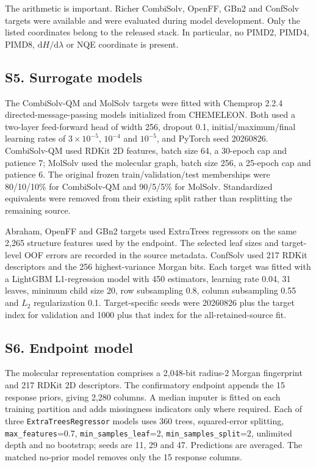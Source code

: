 \documentclass[10pt]{article}
\begin{document}
The arithmetic is important. Richer CombiSolv, OpenFF, GBn2 and ConfSolv targets were
available and were evaluated during model development. Only the listed coordinates
belong to the released stack. In particular, no PIMD2, PIMD4, PIMD8,
$\mathrm{d}H/\mathrm{d}\lambda$ or NQE coordinate is present.

\subsection*{S5. Surrogate models}

The CombiSolv-QM and MolSolv targets were fitted with Chemprop 2.2.4
directed-message-passing models initialized from CHEMELEON. Both used a two-layer
feed-forward head of width 256, dropout 0.1, initial/maximum/final learning rates of
$3\times10^{-5}$, $10^{-4}$ and $10^{-5}$, and PyTorch seed 20260826. CombiSolv-QM
used RDKit 2D features, batch size 64, a 30-epoch cap and patience 7; MolSolv used the
molecular graph, batch size 256, a 25-epoch cap and patience 6. The original frozen
train/validation/test memberships were 80/10/10\% for CombiSolv-QM and 90/5/5\% for
MolSolv. Standardized equivalents were removed from their existing split rather than
resplitting the remaining source.

Abraham, OpenFF and GBn2 targets used ExtraTrees regressors on the same 2,265
structure features used by the endpoint. The selected leaf sizes and target-level
OOF errors are recorded in the source metadata. ConfSolv used 217 RDKit descriptors
and the 256 highest-variance Morgan bits. Each target was fitted with a LightGBM
L1-regression model with 450 estimators, learning rate 0.04, 31 leaves, minimum child
size 20, row subsampling 0.8, column subsampling 0.55 and $L_2$ regularization 0.1.
Target-specific seeds were 20260826 plus the target index for validation and 1000
plus that index for the all-retained-source fit.

\subsection*{S6. Endpoint model}

The molecular representation comprises a 2,048-bit radius-2 Morgan fingerprint and
217 RDKit 2D descriptors. The confirmatory endpoint appends the 15 response priors,
giving 2,280 columns. A median imputer is fitted on each training partition and adds
missingness indicators only where required. Each of three
\texttt{ExtraTreesRegressor} models uses 360 trees, squared-error splitting,
\texttt{max\_features}=0.7, \texttt{min\_samples\_leaf}=2,
\texttt{min\_samples\_split}=2, unlimited depth and no bootstrap; seeds are 11, 29
and 47. Predictions are averaged. The matched no-prior model removes only the 15
response columns.
\end{document}
